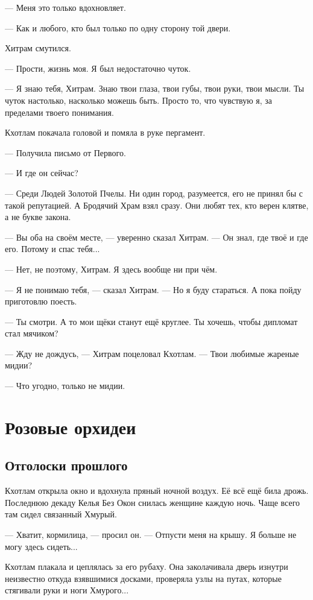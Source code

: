 --- Меня это только вдохновляет.

--- Как и любого, кто был только по одну сторону той двери.

Хитрам смутился.

--- Прости, жизнь моя.
Я был недостаточно чуток.

--- Я знаю тебя, Хитрам.
Знаю твои глаза, твои губы, твои руки, твои мысли.
Ты чуток настолько, насколько можешь быть.
Просто то, что чувствую я, за пределами твоего понимания.

Кхотлам покачала головой и помяла в руке пергамент.

--- Получила письмо от Первого.

--- И где он сейчас?

--- Среди Людей Золотой Пчелы.
Ни один город, разумеется, его не принял бы с такой репутацией.
А Бродячий Храм взял сразу.
Они любят тех, кто верен клятве, а не букве закона.

--- Вы оба на своём месте, --- уверенно сказал Хитрам.
--- Он знал, где твоё и где его.
Потому и спас тебя...

--- Нет, не поэтому, Хитрам.
Я здесь вообще ни при чём.

--- Я не понимаю тебя, --- сказал Хитрам.
--- Но я буду стараться.
А пока пойду приготовлю поесть.

--- Ты смотри.
А то мои щёки станут ещё круглее.
Ты хочешь, чтобы дипломат стал мячиком?

--- Жду не дождусь, --- Хитрам поцеловал Кхотлам.
--- Твои любимые жареные мидии?

--- Что угодно, только не мидии.

\chapter{Розовые орхидеи}

\section{Отголоски прошлого}

Кхотлам открыла окно и вдохнула пряный ночной воздух.
Её всё ещё била дрожь.
Последнюю декаду Келья Без Окон снилась женщине каждую ночь.
Чаще всего там сидел связанный Хмурый.

--- Хватит, кормилица, --- просил он.
--- Отпусти меня на крышу.
Я больше не могу здесь сидеть...

Кхотлам плакала и цеплялась за его рубаху.
Она заколачивала дверь изнутри неизвестно откуда взявшимися досками, проверяла узлы на путах, которые стягивали руки и ноги Хмурого...

